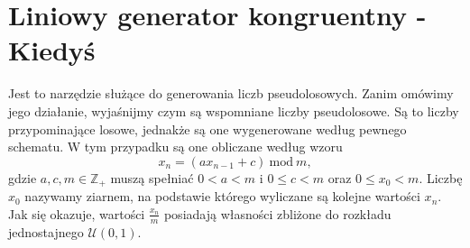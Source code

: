 \documentclass[12pt]{mwrep}
\begin{document}
	
	
	
	
	
	
	



	\section{Liniowy generator kongruentny - Kiedyś}
	\noindent Jest to narzędzie służące do generowania liczb pseudolosowych. Zanim omówimy jego działanie, wyjaśnijmy czym są wspomniane liczby pseudolosowe. Są to liczby przypominające losowe, jednakże są one wygenerowane według pewnego schematu. W tym przypadku są one obliczane według wzoru
	$$ x_n = (ax_{n-1} + c)\ \mathrm{mod}\ m, $$
	gdzie $a, c, m \in \mathbb{Z}_+$ muszą spełniać $0 < a < m$ i $0 \leq c < m$ oraz  $0 \leq x_0 < m$. Liczbę $x_0$ nazywamy ziarnem, na podstawie którego wyliczane są kolejne wartości $x_n$. Jak się okazuje, wartości $\frac{x_n}{m}$ posiadają własności zbliżone do rozkładu jednostajnego $\mathcal{U}(0, 1)$.
	
\end{document}
